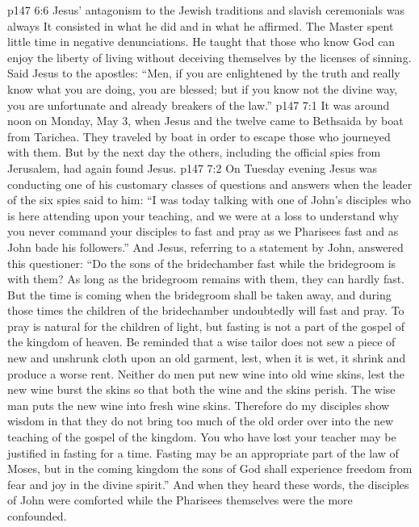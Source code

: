 \vs p147 6:6 \pc Jesus’ antagonism to the Jewish traditions and slavish ceremonials was always  It consisted in what he did and in what he affirmed. The Master spent little time in negative denunciations. He taught that those who know God can enjoy the liberty of living without deceiving themselves by the licenses of sinning. Said Jesus to the apostles: \textcolor{ubdarkred}{“Men, if you are enlightened by the truth and really know what you are doing, you are blessed; but if you know not the divine way, you are unfortunate and already breakers of the law.”}
\vs p147 7:1 It was around noon on Monday, May 3, when Jesus and the twelve came to Bethsaida by boat from Tarichea. They traveled by boat in order to escape those who journeyed with them. But by the next day the others, including the official spies from Jerusalem, had again found Jesus.
\vs p147 7:2 On Tuesday evening Jesus was conducting one of his customary classes of questions and answers when the leader of the six spies said to him: “I was today talking with one of John’s disciples who is here attending upon your teaching, and we were at a loss to understand why you never command your disciples to fast and pray as we Pharisees fast and as John bade his followers.” And Jesus, referring to a statement by John, answered this questioner: \textcolor{ubdarkred}{“Do the sons of the bridechamber fast while the bridegroom is with them? As long as the bridegroom remains with them, they can hardly fast. But the time is coming when the bridegroom shall be taken away, and during those times the children of the bridechamber undoubtedly will fast and pray. To pray is natural for the children of light, but fasting is not a part of the gospel of the kingdom of heaven. Be reminded that a wise tailor does not sew a piece of new and unshrunk cloth upon an old garment, lest, when it is wet, it shrink and produce a worse rent. Neither do men put new wine into old wine skins, lest the new wine burst the skins so that both the wine and the skins perish. The wise man puts the new wine into fresh wine skins. Therefore do my disciples show wisdom in that they do not bring too much of the old order over into the new teaching of the gospel of the kingdom. You who have lost your teacher may be justified in fasting for a time. Fasting may be an appropriate part of the law of Moses, but in the coming kingdom the sons of God shall experience freedom from fear and joy in the divine spirit.”} And when they heard these words, the disciples of John were comforted while the Pharisees themselves were the more confounded.
